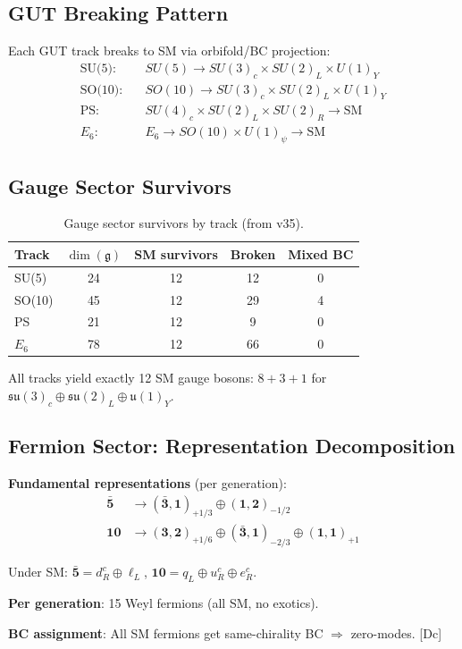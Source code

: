 \documentclass[11pt,a4paper]{article}
\newcommand{\tagDc}{\textcolor{blue!50!black}{[Dc]}}
\begin{document}
\subsection{GUT Breaking Pattern}

Each GUT track breaks to SM via orbifold/BC projection:
\begin{align}
\label{eq:break-su5}
\text{SU(5):} \quad & SU(5) \to SU(3)_c \times SU(2)_L \times U(1)_Y \\
\label{eq:break-so10}
\text{SO(10):} \quad & SO(10) \to SU(3)_c \times SU(2)_L \times U(1)_Y \\
\label{eq:break-ps}
\text{PS:} \quad & SU(4)_c \times SU(2)_L \times SU(2)_R \to \text{SM} \\
\label{eq:break-e6}
E_6: \quad & E_6 \to SO(10) \times U(1)_\psi \to \text{SM}
\end{align}

\subsection{Gauge Sector Survivors}

\begin{table}[h]
\centering
\caption{Gauge sector survivors by track (from v35).}
\label{tab:gauge-survivors}
\begin{tabular}{lcccc}
\toprule
Track & $\dim(\mathfrak{g})$ & SM survivors & Broken & Mixed BC \\
\midrule
SU(5) & 24 & 12 & 12 & 0 \\
SO(10) & 45 & 12 & 29 & 4 \\
PS & 21 & 12 & 9 & 0 \\
$E_6$ & 78 & 12 & 66 & 0 \\
\bottomrule
\end{tabular}
\end{table}

All tracks yield exactly 12 SM gauge bosons: $8 + 3 + 1$ for $\mathfrak{su}(3)_c \oplus \mathfrak{su}(2)_L \oplus \mathfrak{u}(1)_Y$.

\subsection{Fermion Sector: Representation Decomposition}

\begin{trackbox}
\textbf{Fundamental representations} (per generation):
\begin{align}
\label{eq:su5-5bar}
\bar{\mathbf{5}} &\to (\bar{\mathbf{3}}, \mathbf{1})_{+1/3} \oplus (\mathbf{1}, \mathbf{2})_{-1/2} \\
\label{eq:su5-10}
\mathbf{10} &\to (\mathbf{3}, \mathbf{2})_{+1/6} \oplus (\bar{\mathbf{3}}, \mathbf{1})_{-2/3} \oplus (\mathbf{1}, \mathbf{1})_{+1}
\end{align}

Under SM: $\bar{\mathbf{5}} = d_R^c \oplus \ell_L$, $\mathbf{10} = q_L \oplus u_R^c \oplus e_R^c$.

\textbf{Per generation}: 15 Weyl fermions (all SM, no exotics).

\textbf{BC assignment}: All SM fermions get same-chirality BC $\Rightarrow$ zero-modes.
\tagDc
\end{trackbox}
\end{document}
